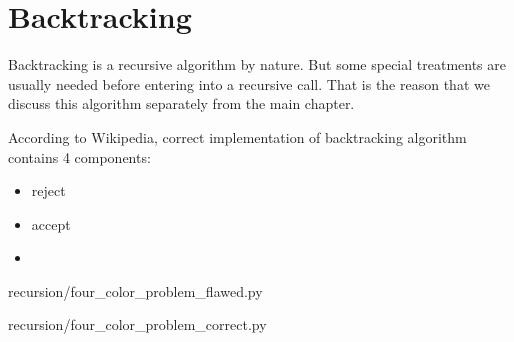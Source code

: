 
\chapter{Backtracking}\label{ch:backtracking}

Backtracking is a recursive algorithm by nature.
But some special treatments are usually needed before entering into a recursive call.
That is the reason that we discuss this algorithm separately from the main chapter.

According to Wikipedia, correct implementation of backtracking algorithm contains 4 components:
\begin{itemize}
    \item reject
    \item accept
    \item
\end{itemize}
\begin{clisting}
    
    {recursion/four_color_problem_flawed.py}
\end{clisting}

\begin{clisting}
    
    {recursion/four_color_problem_correct.py}
\end{clisting}
